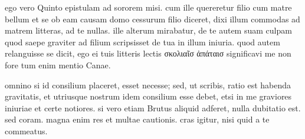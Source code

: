 


 ego vero Quinto epistulam ad sororem misi. cum ille quereretur filio cum matre bellum et se ob eam causam domo cessurum filio diceret, dixi illum commodas ad matrem litteras, ad te nullas. ille alterum mirabatur, de te autem suam culpam quod saepe graviter ad filium scripsisset de tua in illum iniuria. quod autem relanguisse se dicit, ego ei tuis litteris lectis σκολιαῖσ ἀπάταισ significavi me non fore tum enim mentio Canae.

 omnino si id consilium placeret, esset necesse; sed, ut scribis, ratio est habenda gravitatis, et utriusque nostrum idem consilium esse debet, etsi in me graviores iniuriae et certe notiores. si vero etiam Brutus aliquid adferet, nulla dubitatio est. sed coram. magna enim res et multae cautionis. cras igitur, nisi quid a te commeatus.

